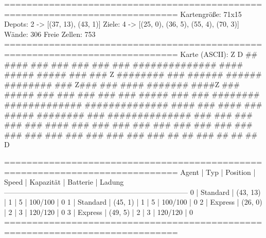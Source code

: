 =============================================================================
Kartengröße:           71x15
Depots:                2 -> [(37, 13), (43, 1)]
Ziele:                 4 -> [(25, 0), (36, 5), (55, 4), (70, 3)]
Wände:                 306
Freie Zellen:          753
=============================================================================
Karte (ASCII):
                         Z
                                           D
   ##       ####     ###       ###     ###         ###  ###
  ##############     ####     #####    #####       ###  ###           Z
  ########   ###    ######   ######    ########    ### Z###
  ###              #### ####### ####Z  ###  #####  ###  ###      ###
  ###              ###   #####   ###   ###    ########  #############
  ##############  ####    ###    ####  ###       #####  ########  ###
  ##############          ###          ###         ###  ###       ###
  ####       ###          ###          ###              ###       ###
  ###        ###          ###          ###              ###       ###
  ###        ###          ###          ###              ###       ###
   ##         ##          ###           ##              ##         ##
                                     D

=============================================================================
 Agent | Typ       | Position    | Speed   | Kapazität  | Batterie  | Ladung
-----------------------------------------------------------------------------
 0     | Standard  | (43, 13)    | 1       | 5          | 100/100   | 0
 1     | Standard  | (45, 1)     | 1       | 5          | 100/100   | 0
 2     | Express   | (26, 0)     | 2       | 3          | 120/120   | 0
 3     | Express   | (49, 5)     | 2       | 3          | 120/120   | 0
=============================================================================